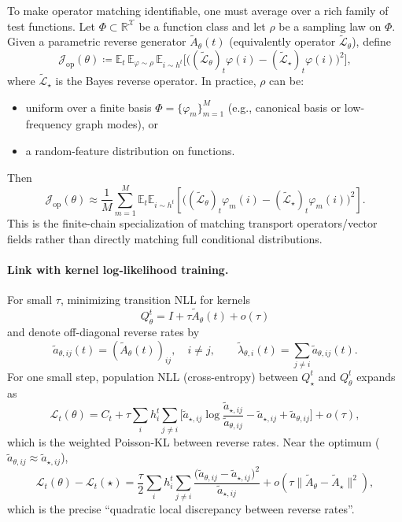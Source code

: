 \documentclass[11pt]{article}
\begin{document}
To make operator matching identifiable, one must average over a rich family of test functions.
Let $\Phi\subset \mathbb R^{\mathcal X}$ be a function class and let $\rho$ be a sampling law on $\Phi$.
Given a parametric reverse generator $\widetilde A_\theta(t)$ (equivalently operator $\widetilde{\mathcal L}_\theta$), define
\[
\mathcal J_{\mathrm{op}}(\theta)
\coloneqq
\mathbb E_{t}\,\mathbb E_{\varphi\sim\rho}\,\mathbb E_{i\sim h^t}\Big[
\big((\widetilde{\mathcal L}_\theta)_t\varphi(i)-(\widetilde{\mathcal L}_\star)_t\varphi(i)\big)^2
\Big],
\]
where $\widetilde{\mathcal L}_\star$ is the Bayes reverse operator.
In practice, $\rho$ can be:
\begin{itemize}
\item uniform over a finite basis $\Phi=\{\varphi_m\}_{m=1}^M$ (e.g., canonical basis or low-frequency graph modes), or
\item a random-feature distribution on functions.
\end{itemize}
Then
\[
\mathcal J_{\mathrm{op}}(\theta)\approx \frac1M\sum_{m=1}^M
\mathbb E_t\mathbb E_{i\sim h^t}\!\left[
\big((\widetilde{\mathcal L}_\theta)_t\varphi_m(i)-(\widetilde{\mathcal L}_\star)_t\varphi_m(i)\big)^2
\right].
\]
This is the finite-chain specialization of matching transport operators/vector fields rather than directly matching full conditional distributions.

\paragraph{Link with kernel log-likelihood training.}
For small $\tau$, minimizing transition NLL for kernels
\[
Q_\theta^t=I+\tau \widetilde A_\theta(t)+o(\tau)
\]
and denote off-diagonal reverse rates by
\[
\widetilde a_{\theta,ij}(t)=(\widetilde A_\theta(t))_{ij},\quad i\neq j,
\qquad
\widetilde\lambda_{\theta,i}(t)=\sum_{j\neq i}\widetilde a_{\theta,ij}(t).
\]
For one small step, population NLL (cross-entropy) between $Q_\star^t$ and $Q_\theta^t$ expands as
\[
\mathcal L_t(\theta)
=C_t
+\tau\sum_i h_i^t
\sum_{j\neq i}\Big[
\widetilde a_{\star,ij}\log\frac{\widetilde a_{\star,ij}}{\widetilde a_{\theta,ij}}
-\widetilde a_{\star,ij}
+\widetilde a_{\theta,ij}
\Big]
+o(\tau),
\]
which is the weighted Poisson-KL between reverse rates.
Near the optimum ($\widetilde a_{\theta,ij}\approx \widetilde a_{\star,ij}$),
\[
\mathcal L_t(\theta)-\mathcal L_t(\star)
=\frac{\tau}{2}\sum_i h_i^t\sum_{j\neq i}
\frac{\big(\widetilde a_{\theta,ij}-\widetilde a_{\star,ij}\big)^2}
{\widetilde a_{\star,ij}}
+o\!\left(\tau\|\widetilde A_\theta-\widetilde A_\star\|^2\right),
\]
which is the precise ``quadratic local discrepancy between reverse rates''.
\end{document}
